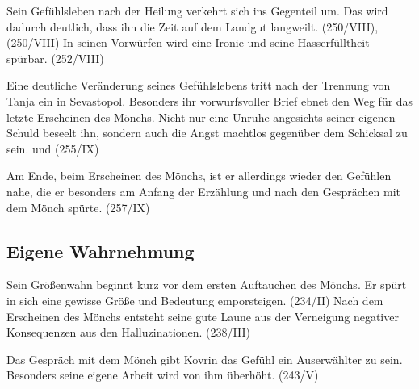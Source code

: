 \documentclass{../../sem_paper}
\begin{document}
Sein Gefühlsleben nach der Heilung verkehrt sich ins Gegenteil um. Das wird dadurch deutlich,
dass ihn die Zeit auf dem Landgut langweilt. (250/VIII), (250/VIII) In seinen
Vorwürfen wird eine Ironie und seine Hasserfülltheit spürbar. (252/VIII)

Eine deutliche Veränderung seines Gefühlslebens tritt nach der Trennung von Tanja ein in
Sevastopol. Besonders ihr vorwurfsvoller Brief ebnet den Weg für das letzte Erscheinen des
Mönchs. Nicht nur eine Unruhe angesichts seiner eigenen Schuld beseelt ihn, sondern auch die
Angst machtlos gegenüber dem Schicksal zu sein.  und (255/IX)

Am Ende, beim Erscheinen des Mönchs, ist er allerdings wieder den Gefühlen nahe, die er
besonders am Anfang der Erzählung und nach den Gesprächen mit dem Mönch spürte. (257/IX)

\subsection{Eigene Wahrnehmung}
Sein Größenwahn beginnt kurz vor dem ersten Auftauchen des Mönchs. Er spürt in sich eine
gewisse Größe und Bedeutung emporsteigen. (234/II)
Nach dem Erscheinen des Mönchs entsteht seine gute Laune aus der Verneigung negativer
Konsequenzen aus den Halluzinationen. (238/III)

Das Gespräch mit dem Mönch gibt Kovrin das Gefühl ein Auserwählter zu sein. Besonders seine
eigene Arbeit wird von ihm überhöht. (243/V)
\end{document}
